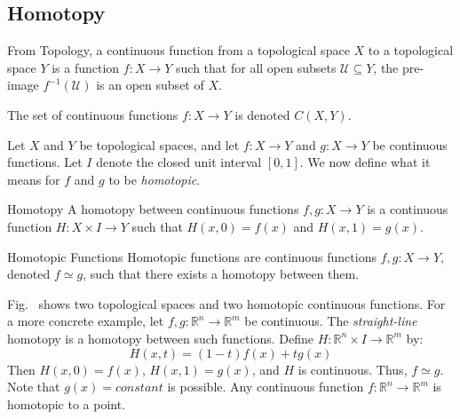 \documentclass[crop=false,class=book,oneside]{standalone}
\begin{document}
        \subsection{Homotopy}
            From Topology, a continuous function from a
            topological space $X$ to a topological space $Y$ is a
            function $f:X\rightarrow{Y}$ such that for all open
            subsets $\mathcal{U}\subseteq{Y}$, the pre-image
            $f^{-1}(\mathcal{U})$ is an open subset of $X$.
            \begin{notation}
                The set of continuous functions
                $f:{X}\rightarrow{Y}$ is denoted $C(X,Y)$.
            \end{notation}
            Let $X$ and $Y$ be topological spaces, and let
            $f:{X}\rightarrow{Y}$ and $g:{X}\rightarrow{Y}$
            be continuous functions. Let $I$ denote the
            closed unit interval $[0,1]$.
            We now define what it means for
            $f$ and $g$ to be \textit{homotopic}.
            \begin{ldefinition}{Homotopy}
                A homotopy between continuous functions
                $f,g:{X}\rightarrow{Y}$ is a continuous
                function $H:{X}\times{I}\rightarrow{Y}$
                such that $H(x,0)=f(x)$ and $H(x,1)=g(x)$.
            \end{ldefinition}
            \begin{ldefinition}{Homotopic Functions}
                Homotopic functions are continuous functions
                $f,g:{X}\rightarrow{Y}$, denoted ${f}\simeq{g}$,
                such that there exists a homotopy between them.
            \end{ldefinition}
            \begin{lexample}
                Fig.~
                shows two topological spaces and two homotopic
                continuous functions. For a more concrete example,
                let $f,g:\mathbb{R}^{n}\rightarrow\mathbb{R}^{m}$
                be continuous. The \textit{straight-line}
                homotopy is a homotopy between such functions. Define
                $H:\mathbb{R}^{n}\times{I}\rightarrow\mathbb{R}^{m}$ by:
                \begin{equation}
                    \label{eqn:Surgery_Theory_Straight_Line_Homotopy}
                    H(x,t)=(1-t)f(x)+tg(x)
                \end{equation}
                Then $H(x,0)=f(x)$, $H(x,1)=g(x)$, and $H$ is
                continuous. Thus, ${f}\simeq{g}$. Note that
                $g(x)=constant$ is possible. Any continuous function
                $f:\mathbb{R}^{n}\rightarrow\mathbb{R}^{m}$
                is homotopic to a point.
            \end{lexample}
\end{document}
